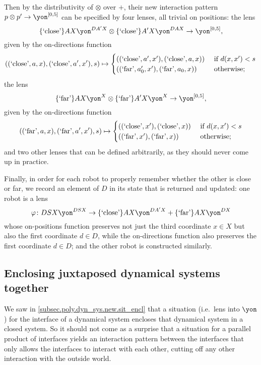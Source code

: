 \documentclass[Book-Poly]{subfiles}
\begin{document}
\begin{exercise}
\begin{solution}
\begin{enumerate}
    Then by the distributivity of $\otimes$ over $+$, their new interaction pattern $p\otimes p'\to\yon^{[0,5]}$ can be specified by four lenses, all trivial on positions: the lens
    \[
        \{\text{`close'}\}AX\yon^{DA'X}\otimes\{\text{`close'}\}A'X\yon^{DAX}\to\yon^{[0,5]},
    \]
    given by the on-directions function
    \[
        ((\text{`close'},a,x),(\text{`close'},a',x'),s)\mapsto
          \begin{cases}
          	((\text{`close'},a',x'),(\text{`close'},a,x))&\textnormal{ if }d(x,x')<s\\
          	((\text{`far'},a'_0,x'),(\text{`far'},a_0,x))&\textnormal{ otherwise};
          \end{cases}
    \]
    the lens
    \[
        \{\text{`far'}\}AX\yon^X\otimes\{\text{`far'}\}A'X\yon^X\to\yon^{[0,5]},
    \]
    given by the on-directions function
    \[
        ((\text{`far'},a,x),(\text{`far'},a',x'),s)\mapsto
          \begin{cases}
          	((\text{`close'},x'),(\text{`close'},x))&\textnormal{ if }d(x,x')<s\\
          	((\text{`far'},x'),(\text{`far'},x))&\textnormal{ otherwise};
          \end{cases}
    \]
    and two other lenses that can be defined arbitrarily, as they should never come up in practice.

    Finally, in order for each robot to properly remember whether the other is close or far, we record an element of $D$ in its state that is returned and updated: one robot is a lens
    \[
        \varphi\colon DSX\yon^{DSX}\to \{\text{`close'}\}AX\yon^{DA'X}+\{\text{`far'}\}AX\yon^{DX}
    \]
    whose on-positions function preserves not just the third coordinate $x\in X$ but also the first coordinate $d\in D$, while the on-directions function also preserves the first coordinate $d\in D$; and the other robot is constructed similarly.
\end{enumerate}
\end{solution}
\end{exercise}

\subsection{Enclosing juxtaposed dynamical systems together}

We saw in \cref{subsec.poly.dyn_sys.new.sit_encl} that a situation (i.e.\ lens into $\yon$) for the interface of a dynamical system encloses that dynamical system in a closed system.
So it should not come as a surprise that a situation for a parallel product of interfaces yields an interaction pattern between the interfaces that only allows the interfaces to interact with each other, cutting off any other interaction with the outside world.
\end{document}
